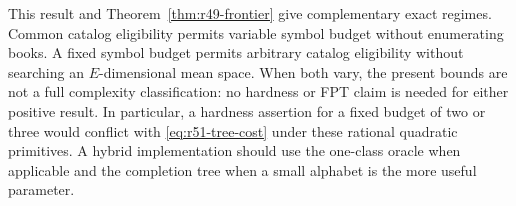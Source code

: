 This result and Theorem~\ref{thm:r49-frontier} give complementary exact regimes. Common catalog eligibility permits variable symbol budget without enumerating books. A fixed symbol budget permits arbitrary catalog eligibility without searching an $E$-dimensional mean space. When both vary, the present bounds are not a full complexity classification: no hardness or FPT claim is needed for either positive result. In particular, a hardness assertion for a fixed budget of two or three would conflict with \eqref{eq:r51-tree-cost} under these rational quadratic primitives. A hybrid implementation should use the one-class oracle when applicable and the completion tree when a small alphabet is the more useful parameter.
